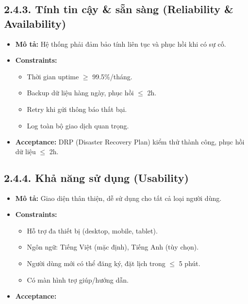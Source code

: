 
\subsection*{2.4.3. Tính tin cậy \& sẵn sàng (Reliability \& Availability)}
\begin{itemize}
    \item \textbf{Mô tả:} Hệ thống phải đảm bảo tính liên tục và phục hồi khi có sự cố.
    \item \textbf{Constraints:} 
    \begin{itemize}
        \item Thời gian uptime $\geq$ 99.5\%/tháng.
        \item Backup dữ liệu hàng ngày, phục hồi $\leq$ 2h.
        \item Retry khi gửi thông báo thất bại.
        \item Log toàn bộ giao dịch quan trọng.
    \end{itemize}
    \item \textbf{Acceptance:} DRP (Disaster Recovery Plan) kiểm thử thành công, phục hồi dữ liệu $\leq$ 2h.
\end{itemize}


\subsection*{2.4.4. Khả năng sử dụng (Usability)}
\begin{itemize}
    \item \textbf{Mô tả:} Giao diện thân thiện, dễ sử dụng cho tất cả loại người dùng.
    \item \textbf{Constraints:} 
    \begin{itemize}
        \item Hỗ trợ đa thiết bị (desktop, mobile, tablet).
        \item Ngôn ngữ: Tiếng Việt (mặc định), Tiếng Anh (tùy chọn).
        \item Người dùng mới có thể đăng ký, đặt lịch trong $\leq$ 5 phút.
        \item Có màn hình trợ giúp/hướng dẫn.
    \end{itemize}
    \item \textbf{Acceptance:}
\end{itemize}

